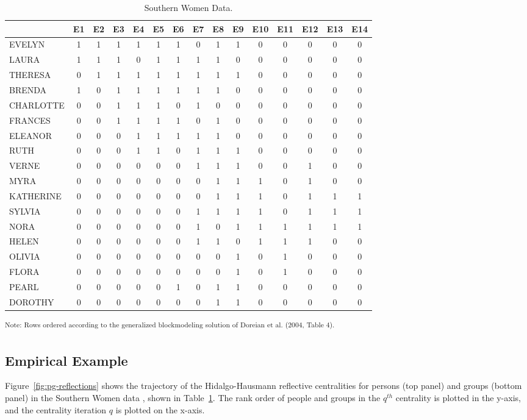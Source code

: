 \documentclass[a4paper,fleqn]{cas-sc}
\begin{document}
\begin{table}
\caption{Southern Women Data.}
\label{tab:southern}
\begin{tabular}[]{lcccccccccccccc}
\hline
 & E1 & E2 & E3 & E4 & E5 & E6 & E7 & E8 & E9 & E10 & E11 & E12 & E13 & E14 \\
 \hline
EVELYN & 1 & 1 & 1 & 1 & 1 & 1 & 0 & 1 & 1 & 0 & 0 & 0 & 0 & 0 \\
LAURA & 1 & 1 & 1 & 0 & 1 & 1 & 1 & 1 & 0 & 0 & 0 & 0 & 0 & 0 \\
THERESA & 0 & 1 & 1 & 1 & 1 & 1 & 1 & 1 & 1 & 0 & 0 & 0 & 0 & 0 \\
BRENDA & 1 & 0 & 1 & 1 & 1 & 1 & 1 & 1 & 0 & 0 & 0 & 0 & 0 & 0 \\
CHARLOTTE & 0 & 0 & 1 & 1 & 1 & 0 & 1 & 0 & 0 & 0 & 0 & 0 & 0 & 0 \\
FRANCES & 0 & 0 & 1 & 1 & 1 & 1 & 0 & 1 & 0 & 0 & 0 & 0 & 0 & 0 \\
ELEANOR & 0 & 0 & 0 & 1 & 1 & 1 & 1 & 1 & 0 & 0 & 0 & 0 & 0 & 0 \\
RUTH & 0 & 0 & 0 & 1 & 1 & 0 & 1 & 1 & 1 & 0 & 0 & 0 & 0 & 0 \\
VERNE & 0 & 0 & 0 & 0 & 0 & 0 & 1 & 1 & 1 & 0 & 0 & 1 & 0 & 0 \\
MYRA & 0 & 0 & 0 & 0 & 0 & 0 & 0 & 1 & 1 & 1 & 0 & 1 & 0 & 0 \\
KATHERINE & 0 & 0 & 0 & 0 & 0 & 0 & 0 & 1 & 1 & 1 & 0 & 1 & 1 & 1 \\
SYLVIA & 0 & 0 & 0 & 0 & 0 & 0 & 1 & 1 & 1 & 1 & 0 & 1 & 1 & 1 \\
NORA & 0 & 0 & 0 & 0 & 0 & 0 & 1 & 0 & 1 & 1 & 1 & 1 & 1 & 1 \\
HELEN & 0 & 0 & 0 & 0 & 0 & 0 & 1 & 1 & 0 & 1 & 1 & 1 & 0 & 0 \\
OLIVIA & 0 & 0 & 0 & 0 & 0 & 0 & 0 & 0 & 1 & 0 & 1 & 0 & 0 & 0 \\
FLORA & 0 & 0 & 0 & 0 & 0 & 0 & 0 & 0 & 1 & 0 & 1 & 0 & 0 & 0 \\
PEARL & 0 & 0 & 0 & 0 & 0 & 1 & 0 & 1 & 1 & 0 & 0 & 0 & 0 & 0 \\
DOROTHY & 0 & 0 & 0 & 0 & 0 & 0 & 0 & 1 & 1 & 0 & 0 & 0 & 0 & 0 \\
\hline
\end{tabular}
\textsuperscript{Note: Rows ordered according to the generalized
blockmodeling solution of Doreian et al. (2004, Table 4).} \\
\end{table}

\subsection{Empirical Example}
Figure~\ref{fig:pg-reflections} shows the trajectory of the Hidalgo-Hausmann reflective centralities for persons (top panel) and groups (bottom panel) in the Southern Women data \citep{davis1941}, shown in Table~\ref{tab:southern}. The rank order of people and groups in the $q^{th}$ centrality is plotted in the y-axis, and the centrality iteration $q$ is plotted on the x-axis.
\end{document}
